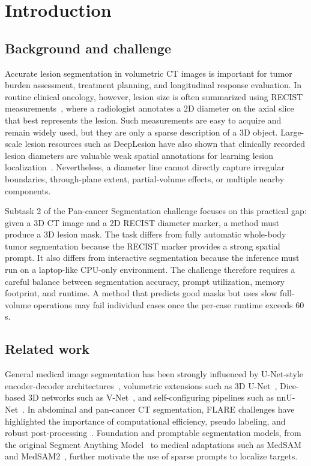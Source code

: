 \documentclass[runningheads]{llncs}
\begin{document}
\section{Introduction}
\label{sec:intro}

\subsection{Background and challenge}
Accurate lesion segmentation in volumetric CT images is important for tumor burden assessment, treatment planning, and longitudinal response evaluation. In routine clinical oncology, however, lesion size is often summarized using RECIST measurements~\cite{RECIST11}, where a radiologist annotates a 2D diameter on the axial slice that best represents the lesion. Such measurements are easy to acquire and remain widely used, but they are only a sparse description of a 3D object. Large-scale lesion resources such as DeepLesion have also shown that clinically recorded lesion diameters are valuable weak spatial annotations for learning lesion localization~\cite{deeplesion}. Nevertheless, a diameter line cannot directly capture irregular boundaries, through-plane extent, partial-volume effects, or multiple nearby components.

Subtask 2 of the Pan-cancer Segmentation challenge focuses on this practical gap: given a 3D CT image and a 2D RECIST diameter marker, a method must produce a 3D lesion mask. The task differs from fully automatic whole-body tumor segmentation because the RECIST marker provides a strong spatial prompt. It also differs from interactive segmentation because the inference must run on a laptop-like CPU-only environment. The challenge therefore requires a careful balance between segmentation accuracy, prompt utilization, memory footprint, and runtime. A method that predicts good masks but uses slow full-volume operations may fail individual cases once the per-case runtime exceeds 60 s.

\subsection{Related work}
General medical image segmentation has been strongly influenced by U-Net-style encoder-decoder architectures~\cite{U-Net}, volumetric extensions such as 3D U-Net~\cite{ThreeDUNet}, Dice-based 3D networks such as V-Net~\cite{VNet}, and self-configuring pipelines such as nnU-Net~\cite{nnUNet}. In abdominal and pan-cancer CT segmentation, FLARE challenges have highlighted the importance of computational efficiency, pseudo labeling, and robust post-processing~\cite{MedIA-FLARE21,FLARE22,FLARE23}. Foundation and promptable segmentation models, from the original Segment Anything Model~\cite{SAM} to medical adaptations such as MedSAM and MedSAM2~\cite{MedSAM,MedSAM2}, further motivate the use of sparse prompts to localize targets.
\end{document}

